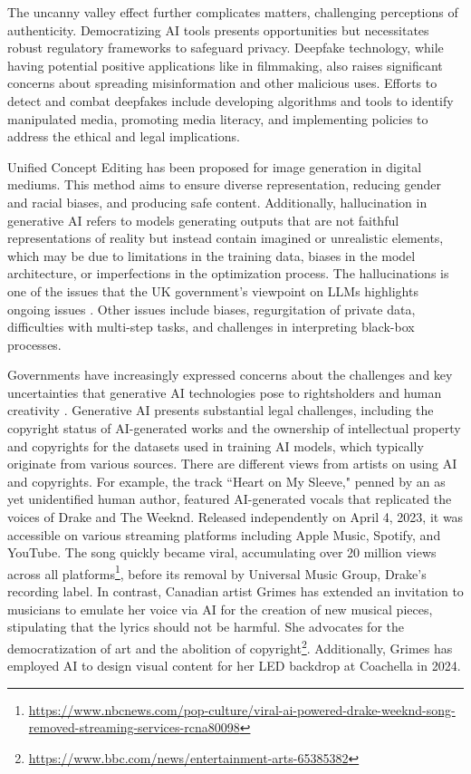 \documentclass[11pt,a4paper]{article}
\begin{document}
The uncanny valley effect further complicates matters, challenging perceptions of authenticity. Democratizing AI tools presents opportunities but necessitates robust regulatory frameworks to safeguard privacy. Deepfake technology, while having potential positive applications like in filmmaking, also raises significant concerns about spreading misinformation and other malicious uses. Efforts to detect and combat deepfakes include developing algorithms and tools to identify manipulated media, promoting media literacy, and implementing policies to address the ethical and legal implications.

Unified Concept Editing \cite{Gandikota:Unified:2024} has been proposed for image generation in digital mediums. This method aims to ensure diverse representation, reducing gender and racial biases, and producing safe content. Additionally, hallucination in generative AI refers to models generating outputs that are not faithful representations of reality but instead contain imagined or unrealistic elements, which may be due to limitations in the training data, biases in the model architecture, or imperfections in the optimization process. The hallucinations is one of the issues that the UK government's viewpoint on LLMs highlights ongoing issues \cite{UK:Large:2024}. Other issues include biases, regurgitation of private data, difficulties with multi-step tasks, and challenges in interpreting black-box processes.

Governments have increasingly expressed concerns about the challenges and key uncertainties that generative AI technologies pose to rightsholders and human creativity \cite{Jeary2024}. Generative AI presents substantial legal challenges, including the copyright status of AI-generated works and the ownership of intellectual property and copyrights for the datasets used in training AI models, which typically originate from various sources. There are different views from artists on using AI and copyrights. For example, the track ``Heart on My Sleeve," penned by an as yet unidentified human author, featured AI-generated vocals that replicated the voices of Drake and The Weeknd. Released independently on April 4, 2023, it was accessible on various streaming platforms including Apple Music, Spotify, and YouTube. The song quickly became viral, accumulating over 20 million views across all platforms\footnote{\url{https://www.nbcnews.com/pop-culture/viral-ai-powered-drake-weeknd-song-removed-streaming-services-rcna80098}}, before its removal by Universal Music Group, Drake's recording label. In contrast, Canadian artist Grimes has extended an invitation to musicians to emulate her voice via AI for the creation of new musical pieces, stipulating that the lyrics should not be harmful. She advocates for the democratization of art and the abolition of copyright\footnote{\url{https://www.bbc.com/news/entertainment-arts-65385382}}. Additionally, Grimes has employed AI to design visual content for her LED backdrop at Coachella in 2024.
\end{document}
